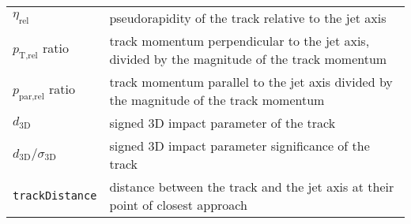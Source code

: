 \begin{table}[htb!]
\begin{center}
{\begin{tabular}{ll}
    $\eta_{\text{rel}}$ & pseudorapidity of the track relative to the jet axis \\
    $p_{\text{T,rel}}$ ratio & track momentum perpendicular to the jet axis,
    divided by the magnitude of the track momentum \\
    $p_{\text{par,rel}}$ ratio & track momentum parallel to the jet axis divided by
    the magnitude of the track momentum \\
    $d_{\text{3D}}$ &  signed 3D impact parameter of the track \\
    $d_{\text{3D}}/\sigma_{\text{3D}}$ & signed 3D impact parameter significance of
    the track \\
    \texttt{trackDistance} & distance between the track and the jet axis at their
    point of closest approach \\
    \hline\hline


\end{tabular}}
\end{center}
\end{table}

